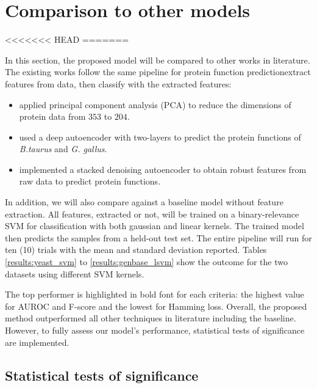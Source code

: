 \section{Comparison to other models}
\label{Benchmarking}

<<<<<<< HEAD
=======
\par In this section, the proposed model will be compared to other works in
literature. The existing works follow the same pipeline for protein function
prediction\textemdash extract features from data, then classify with the
extracted features:

\begin{itemize}
    \item \cite{wang2013protein} applied principal component
    analysis (PCA) to reduce the dimensions of protein data from $353$ to
    $204$. 
    \item \cite{chicco2014deep} used a deep autoencoder with two-layers
    to predict the protein functions of \textit{B.taurus} and \textit{G.
    gallus}. 
    \item \cite{miranda2017feature} implemented a stacked denoising
    autoencoder to obtain robust features from raw data to predict protein
    functions.  
\end{itemize}

\par In addition, we will also compare against a baseline model without feature
extraction. All features, extracted or not, will be trained on a
binary-relevance SVM for classification with both gaussian and linear kernels.
The trained model then predicts the samples from a held-out test set.  The
entire pipeline will run for ten (10) trials with the mean and standard
deviation reported. Tables \ref{results:yeast_svm} to \ref{results:genbase_lsvm}
show the outcome for the two datasets using different SVM kernels.

\par The top performer is highlighted in bold font for each criteria: the
highest value for AUROC and F-score and the lowest for Hamming loss. Overall,
the proposed method outperformed all other techniques in literature including
the baseline. However, to fully assess our model's performance, statistical
tests of significance are implemented.

\subsection{Statistical tests of significance}


